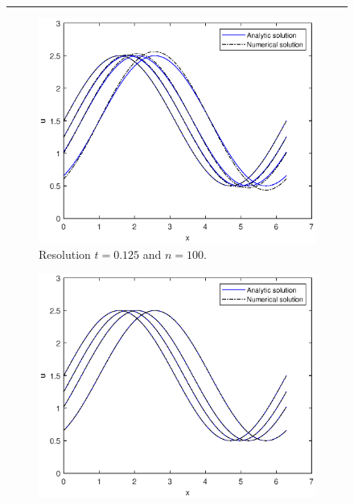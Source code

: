 \documentclass[a4paper, 12pt]{article}
\begin{document}
\begin{figure}[H]
\begin{center}
\rule{\linewidth}{.4pt}
\end{center}
\begin{subfigure}[b]{0.5\textwidth}
\includegraphics[width=\textwidth]{Q1_t=0.125n=100}\hfill
\caption{Resolution $t=0.125$ and $n=100$.}%
\end{subfigure}
\begin{subfigure}[b]{0.5\textwidth}
\includegraphics[width=\textwidth]{Q1_t=0.001n=100}\hfill

\end{subfigure}
\end{figure}
\end{document}
